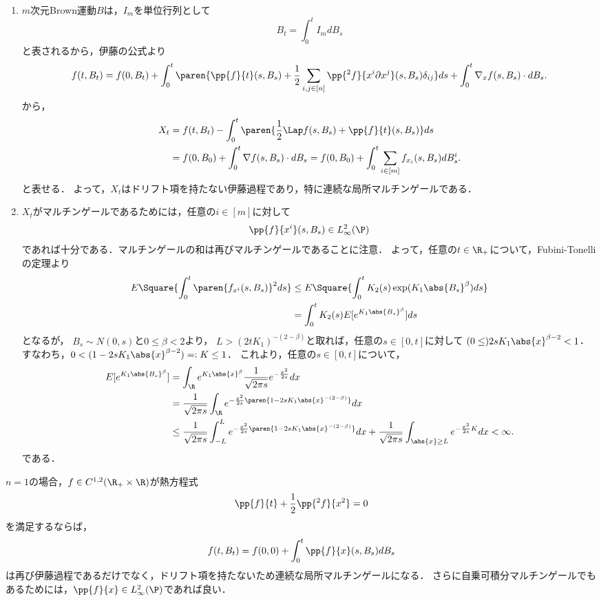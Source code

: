 \documentclass[uplatex,dvipdfmx]{jsreport}
\begin{document}
\begin{Proof}\mbox{}
    \begin{enumerate}
        \item $m$次元Brown運動$B$は，$I_m$を単位行列として
        \[B_t=\int^t_0I_mdB_s\]
        と表されるから，伊藤の公式より
        \[f(t,B_t)=f(0,B_t)+\int^t_0\paren{\pp{f}{t}(s,B_s)+\frac{1}{2}\sum_{i,j\in[n]}\pp{^2f}{x^i\partial x^j}(s,B_s)\delta_{ij}}ds+\int^t_0\nabla_xf(s,B_s)\cdot dB_s.\]
        から，
        \begin{align*}
            X_t&=f(t,B_t)-\int^t_0\paren{\frac{1}{2}\Lap f(s,B_s)+\pp{f}{t}(s,B_s)}ds\\
            &=f(0,B_0)+\int^t_0\nabla f(s,B_s)\cdot dB_s=f(0,B_0)+\int^t_0\sum_{i\in[m]}f_{x_i}(s,B_s)dB_s^i.
        \end{align*}
        と表せる．
        よって，$X_t$はドリフト項を持たない伊藤過程であり，特に連続な局所マルチンゲールである．
        \item $X_t$がマルチンゲールであるためには，任意の$i\in[m]$に対して
        \[\pp{f}{x^i}(s,B_s)\in L^2_\infty(\P)\]
        であれば十分である．マルチンゲールの和は再びマルチンゲールであることに注意．
        よって，任意の$t\in\R_+$について，Fubini-Tonelliの定理より
        \begin{align*}
            E\Square{\int^t_0\paren{f_{x^i}(s,B_s)}^2ds}&\le E\Square{\int^t_0K_2(s)\exp(K_1\abs{B_s}^\beta)ds}\\
            &=\int^t_0K_2(s)E[e^{K_1\abs{B_s}^\beta}]ds
        \end{align*}
        となるが，
        $B_s\sim N(0,s)$と$0\le\beta<2$より，
        $L>(2tK_1)^{-(2-\beta)}$と取れば，任意の$s\in[0,t]$に対して
        $(0\le)2sK_1\abs{x}^{\beta-2}<1$．すなわち，$0<(1-2sK_1\abs{x}^{\beta-2})=:K\le 1$．
        これより，任意の$s\in[0,t]$について，
        \begin{align*}
            E[e^{K_1\abs{B_s}^\beta}]&=\int_\R e^{K_1\abs{x}^\beta}\frac{1}{\sqrt{2\pi s}}e^{-\frac{x^2}{2s}}dx\\
            &=\frac{1}{\sqrt{2\pi s}}\int_\R e^{-\frac{x^2}{2s}\paren{1-2sK_1\abs{x}^{-(2-\beta)}}}dx\\
            &\le\frac{1}{\sqrt{2\pi s}}\int^L_{-L}e^{-\frac{x^2}{2s}\paren{1-2sK_1\abs{x}^{-(2-\beta)}}}dx+\frac{1}{\sqrt{2\pi s}}\int_{\abs{x}\ge L}e^{-\frac{x^2}{2s}K}dx<\infty.
        \end{align*}
        である．
    \end{enumerate}
\end{Proof}
\begin{remarks}[熱方程式の解について局所マルチンゲール性は保存する]
    $n=1$の場合，$f\in C^{1,2}(\R_+\times\R)$が熱方程式
    \[\pp{f}{t}+\frac{1}{2}\pp{^2f}{x^2}=0\]
    を満足するならば，
    \[f(t,B_t)=f(0,0)+\int^t_0\pp{f}{x}(s,B_s)dB_s\]
    は再び伊藤過程であるだけでなく，ドリフト項を持たないため連続な局所マルチンゲールになる．
    さらに自乗可積分マルチンゲールでもあるためには，$\pp{f}{x}\in L^2_\infty(\P)$であれば良い．
\end{remarks}
\end{document}
